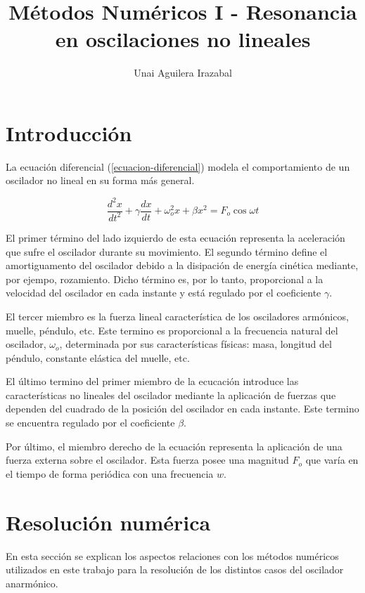 \documentclass[11pt]{article}
\title{Métodos Numéricos I - Resonancia en oscilaciones no lineales}
\author{Unai Aguilera Irazabal}
\begin{document}
\maketitle
\tableofcontents

\pagebreak
\renewcommand{\tablename}{Tabla}

\section{Introducción}
La ecuación diferencial (\ref{ecuacion-diferencial}) modela el comportamiento de
un oscilador no lineal en su forma más general.

\begin{equation}
\label{ecuacion-diferencial}
	 \frac{d^2 x}{dt^2} + \gamma\frac{dx}{dt} + \omega_{o}^2x 
	 + \beta{}x^2 = F_{o}\cos{\omega{}t}
\end{equation}

El primer término del lado izquierdo de esta ecuación representa la aceleración
que sufre el oscilador durante su movimiento. El segundo término define el 
amortiguamento del oscilador debido a la disipación de energía cinética mediante,
por ejempo, rozamiento. Dicho término es, por lo tanto, proporcional a la
velocidad del oscilador en cada instante y está regulado por el coeficiente
$\gamma$.

El tercer miembro es la fuerza lineal característica de los osciladores armónicos,
muelle, péndulo, etc. Este termino es proporcional a la frecuencia natural del
oscilador, $\omega_{o}$, determinada por sus características físicas: masa,
longitud del péndulo, constante elástica del muelle, etc.

El último termino del primer miembro de la ecucación introduce las 
características no lineales del oscilador mediante la aplicación de fuerzas que
dependen del cuadrado de la posición del oscilador en cada instante. Este
termino se encuentra regulado por el coeficiente $\beta$.

Por último, el miembro derecho de la ecuación representa la aplicación de una
fuerza externa sobre el oscilador. Esta fuerza posee una magnitud $F_{o}$ que
varía en el tiempo de forma periódica con una frecuencia $w$.

\section{Resolución numérica}
En esta sección se explican los aspectos relaciones con los métodos numéricos
utilizados en este trabajo para la resolución de los distintos casos del
oscilador anarmónico.
\end{document}
